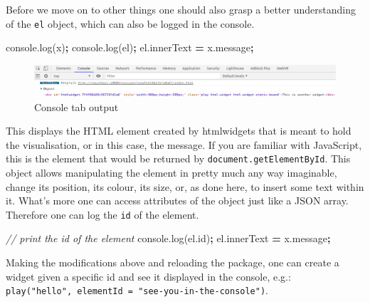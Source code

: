 \documentclass[
]{krantz}
\makeatletter
\newenvironment{Shaded}{\begin{snugshade}}{\end{snugshade}}
\newcommand{\AttributeTok}[1]{\textcolor[rgb]{0.61,0.61,0.61}{#1}}
\newcommand{\CommentTok}[1]{\textcolor[rgb]{0.37,0.37,0.37}{\textit{#1}}}
\newcommand{\NormalTok}[1]{#1}
\newcommand{\OperatorTok}[1]{\textcolor[rgb]{0.43,0.43,0.43}{\textbf{#1}}}
\newcommand{\VariableTok}[1]{\textcolor[rgb]{0,0,0}{#1}}
\newenvironment{kframe}{%
\medskip{}
\setlength{\fboxsep}{.8em}
 \def\at@end@of@kframe{}%
 \ifinner\ifhmode%
  \def\at@end@of@kframe{\end{minipage}}%
  \begin{minipage}{\columnwidth}%
 \fi\fi%
 \def\FrameCommand##1{\hskip\@totalleftmargin \hskip-\fboxsep
 \colorbox{shadecolor}{##1}\hskip-\fboxsep
     \hskip-\linewidth \hskip-\@totalleftmargin \hskip\columnwidth}%
 \MakeFramed {\advance\hsize-\width
   \@totalleftmargin\z@ \linewidth\hsize
   \@setminipage}}%
 {\par\unskip\endMakeFramed%
 \at@end@of@kframe}
\renewenvironment{Shaded}{\begin{kframe}}{\end{kframe}}
\makeatother
\begin{document}
Before we move on to other things one should also grasp a better understanding of the \texttt{el} object, which can also be logged in the console.

\begin{Shaded}
\begin{Highlighting}[]
\VariableTok{console}\NormalTok{.}\AttributeTok{log}\NormalTok{(x)}\OperatorTok{;}
\VariableTok{console}\NormalTok{.}\AttributeTok{log}\NormalTok{(el)}\OperatorTok{;}
\VariableTok{el}\NormalTok{.}\AttributeTok{innerText} \OperatorTok{=} \VariableTok{x}\NormalTok{.}\AttributeTok{message}\OperatorTok{;}
\end{Highlighting}
\end{Shaded}

\begin{figure}
\centering
\includegraphics{images/playground-console-el.png}
\caption{Console tab output}
\end{figure}

This displays the HTML element created by htmlwidgets that is meant to hold the visualisation, or in this case, the message. If you are familiar with JavaScript, this is the element that would be returned by \texttt{document.getElementById}. This object allows manipulating the element in pretty much any way imaginable, change its position, its colour, its size, or, as done here, to insert some text within it. What's more one can access attributes of the object just like a JSON array. Therefore one can log the \texttt{id} of the element.

\begin{Shaded}
\begin{Highlighting}[]
\CommentTok{// print the id of the element}
\VariableTok{console}\NormalTok{.}\AttributeTok{log}\NormalTok{(}\VariableTok{el}\NormalTok{.}\AttributeTok{id}\NormalTok{)}\OperatorTok{;}
\VariableTok{el}\NormalTok{.}\AttributeTok{innerText} \OperatorTok{=} \VariableTok{x}\NormalTok{.}\AttributeTok{message}\OperatorTok{;}
\end{Highlighting}
\end{Shaded}

Making the modifications above and reloading the package, one can create a widget given a specific id and see it displayed in the console, e.g.: \texttt{play("hello",\ elementId\ =\ "see-you-in-the-console")}.
\end{document}
